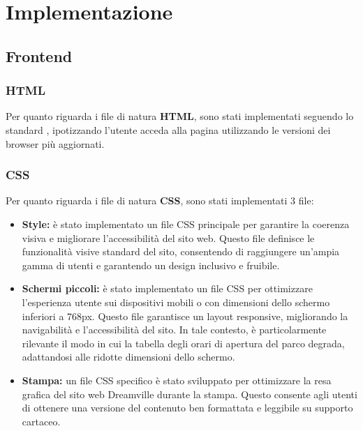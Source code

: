\section{Implementazione}
\subsection{Frontend}
\subsubsection{HTML}
Per quanto riguarda i file di natura \textbf{HTML}, sono stati implementati seguendo lo standard , ipotizzando l'utente acceda alla pagina utilizzando le versioni dei browser più aggiornati.

\subsubsection{CSS}
Per quanto riguarda i file di natura \textbf{CSS}, sono stati implementati 3 file:
\begin{itemize}
    \item \textbf{Style:} è stato implementato un file CSS principale per garantire la coerenza visiva e migliorare l'accessibilità del sito web. Questo file definisce le funzionalità visive standard del sito, consentendo di raggiungere un'ampia gamma di utenti e garantendo un design inclusivo e fruibile.
    \item \textbf{Schermi piccoli:} è stato implementato un file CSS per ottimizzare l'esperienza utente sui dispositivi mobili o con dimensioni dello schermo inferiori a 768px. Questo file garantisce un layout responsive, migliorando la navigabilità e l'accessibilità del sito. In tale contesto, è particolarmente rilevante il modo in cui la tabella degli orari di apertura del parco degrada, adattandosi alle ridotte dimensioni dello schermo.
    \item \textbf{Stampa:} un file CSS specifico è stato sviluppato per ottimizzare la resa grafica del sito web Dreamville durante la stampa. Questo consente agli utenti di ottenere una versione del contenuto ben formattata e leggibile su supporto cartaceo.
\end{itemize}


